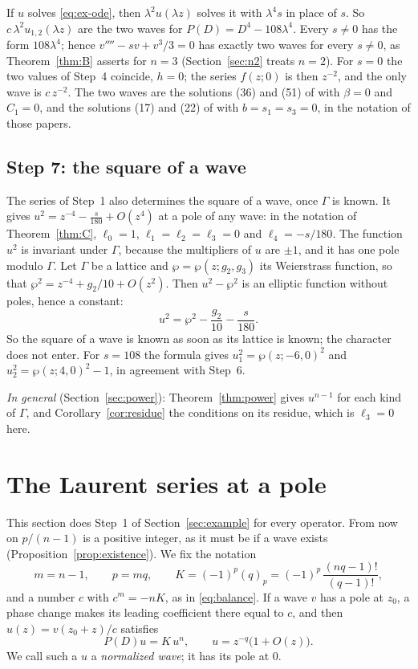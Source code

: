 \documentclass[11pt]{article}
\theoremstyle{definition}
\theoremstyle{remark}
\numberwithin{equation}{section}
\begin{document}
If \(u\) solves \eqref{eq:ex-ode}, then \(\lambda^2u(\lambda z)\)
solves it with \(\lambda^4s\) in place of \(s\). So
\(c\,\lambda^2u_{1,2}(\lambda z)\) are the two waves for
\(P(D)=D^4-108\lambda^4\). Every \(s\ne0\) has the form
\(108\lambda^4\); hence \(v''''-sv+v^3/3=0\) has exactly two waves for
every \(s\ne0\), as Theorem~\ref{thm:B} asserts for \(n=3\)
(Section~\ref{sec:n2} treats \(n=2\)). For
\(s=0\) the two values of Step~4 coincide, \(h=0\); the series
\(f(z;0)\) is then \(z^{-2}\), and the only wave is \(c\,z^{-2}\). The
two waves are the solutions (36) and (51) of
\citet{DeminaKudryashovKawahara2010} with \(\beta=0\) and \(C_1=0\),
and the solutions (17) and (22) of \citet*{ConteNgWong2012} with
\(b=s_1=s_3=0\), in the notation of those papers.

\subsection{Step 7: the square of a wave}\label{sec:ex-power}

The series of Step~1 also determines the square of a wave, once
\(\Gamma\) is known. It gives \(u^2=z^{-4}-\tfrac{s}{180}+O(z^4)\) at a
pole of any wave: in the notation of Theorem~\ref{thm:C}, \(\ell_0=1\),
\(\ell_1=\ell_2=\ell_3=0\) and \(\ell_4=-s/180\). The function \(u^2\)
is invariant under \(\Gamma\), because the multipliers of \(u\) are
\(\pm1\), and it has one pole modulo \(\Gamma\). Let \(\Gamma\) be a
lattice and \(\wp=\wp(z;g_2,g_3)\) its Weierstrass function, so that
\(\wp^2=z^{-4}+g_2/10+O(z^2)\). Then \(u^2-\wp^2\) is an elliptic
function without poles, hence a constant:
\[
 u^2=\wp^2-\frac{g_2}{10}-\frac{s}{180}.
\]
So the square of a wave is known as soon as its lattice is known; the
character does not enter. For \(s=108\) the formula gives
\(u_1^2=\wp(z;-6,0)^2\) and \(u_2^2=\wp(z;4,0)^2-1\), in agreement with
Step~6.

\emph{In general} (Section~\ref{sec:power}): Theorem~\ref{thm:power}
gives \(u^{n-1}\) for each kind of \(\Gamma\), and
Corollary~\ref{cor:residue} the conditions on its residue, which is
\(\ell_3=0\) here.

\section{The Laurent series at a pole}\label{sec:local}\label{sec:origin}\label{sec:laurent}

This section does Step~1 of Section~\ref{sec:example} for every operator. From now on \(p/(n-1)\)
is a positive integer, as it must be if a wave exists
(Proposition~\ref{prop:existence}). We fix the notation
\[
 m=n-1,\qquad p=mq,\qquad
 K=(-1)^p(q)_p=(-1)^p\,\frac{(nq-1)!}{(q-1)!},
\]
and a number \(c\) with \(c^m=-nK\), as in \eqref{eq:balance}. If a
wave \(v\) has a pole at \(z_0\), a phase change makes its leading
coefficient there equal to \(c\), and then \(u(z)=v(z_0+z)/c\)
satisfies
\begin{equation}\label{eq:normalized}
 P(D)u=K\,u^n,\qquad u=z^{-q}\bigl(1+O(z)\bigr).
\end{equation}
We call such a \(u\) a \emph{normalized wave}; it has its pole at
\(0\).
\end{document}
